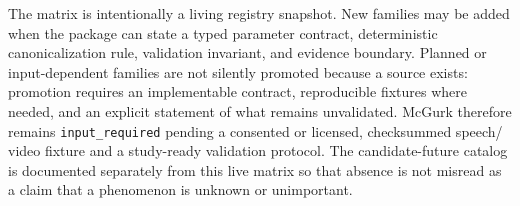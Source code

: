 \documentclass[
  english,
]{article}
\begin{document}
The matrix is intentionally a living registry snapshot. New families may
be added when the package can state a typed parameter contract,
deterministic canonicalization rule, validation invariant, and evidence
boundary. Planned or input-dependent families are not silently promoted
because a source exists: promotion requires an implementable contract,
reproducible fixtures where needed, and an explicit statement of what
remains unvalidated. McGurk therefore remains \texttt{input\_required}
pending a consented or licensed, checksummed speech/ video fixture and a
study-ready validation protocol. The candidate-future catalog is
documented separately from this live matrix so that absence is not
misread as a claim that a phenomenon is unknown or unimportant.

\newpage



\clearpage


\end{document}
